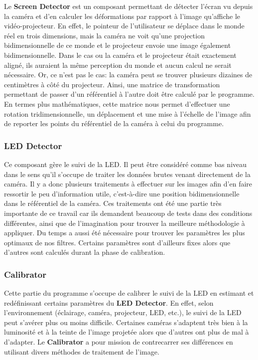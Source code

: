 \documentclass[11pt,a4paper,oldfontcommands]{memoir}
\begin{document}
Le \textbf{Screen Detector} est un composant permettant de détecter l'écran vu depuis la caméra et d'en calculer les déformations par rapport à l'image qu'affiche le vidéo-projecteur. En effet, le pointeur de l'utilisateur se déplace dans le monde réel en trois dimensions, mais la caméra ne voit qu'une projection bidimensionnelle de ce monde et le projecteur envoie une image également bidimensionnelle. Dans le cas ou la caméra et le projecteur était exactement aligné, ils auraient la même perception du monde et aucun calcul ne serait nécessaire. Or, ce n'est pas le cas: la caméra peut se trouver plusieurs dizaines de centimètres à côté du projecteur. Ainsi, une matrice de transformation permettant de passer d'un référentiel à l'autre doit être calculé par le programme. En termes plus mathématiques, cette matrice nous permet d'effectuer une rotation tridimensionnelle, un déplacement et une mise à l'échelle de l'image afin de reporter les points du référentiel de la caméra à celui du programme.

\subsubsection{LED Detector}

Ce composant gère le suivi de la LED. Il peut être considéré comme bas niveau dans le sens qu'il s'occupe de traiter les données brutes venant directement de la caméra. Il y a donc plusieurs traitements à effectuer sur les images afin d'en faire ressortir le peu d'information utile, c'est-à-dire une position bidimensionnelle dans le référentiel de la caméra. Ces traitements ont été une partie très importante de ce travail car ils demandent beaucoup de tests dans des conditions différentes, ainsi que de l'imagination pour trouver la meilleure méthodologie à appliquer. Du temps a aussi été nécessaire pour trouver les paramètres les plus optimaux de nos filtres. Certains paramètres sont d'ailleurs fixes alors que d'autres sont calculés durant la phase de calibration.

\subsubsection{Calibrator}

Cette partie du programme s'occupe de calibrer le suivi de la LED en estimant et redéfinissant certains paramètres du \textbf{LED Detector}. En effet, selon l'environnement (éclairage, caméra, projecteur, LED, etc.), le suivi de la LED peut s'avérer plus ou moins difficile. Certaines caméras s'adaptent très bien à la luminosité et à la teinte de l'image projetée alors que d'autres ont plus de mal à d'adapter. Le \textbf{Calibrator} a pour mission de contrecarrer ses différences en utilisant divers méthodes de traitement de l'image.
\end{document}
